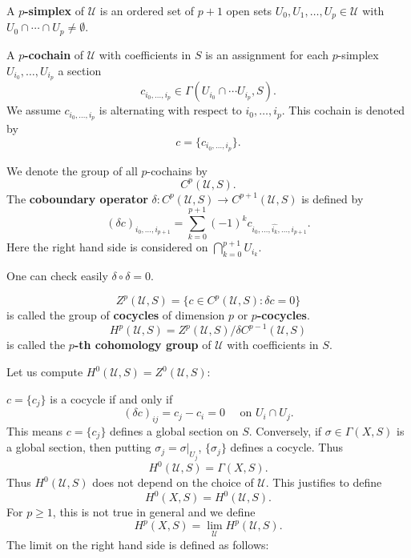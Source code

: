 \documentclass[12pt]{article}
\begin{document}
\begin{definition}
  A \textbf{\(p\)-simplex} of \(\mathcal{U}\) is an ordered set of \(p+1\) open sets
  \(U_0,U_1,\ldots,U_p\in \mathcal{U}\) with \(U_0\cap \cdots \cap U_p\neq\emptyset\).
\end{definition}
\begin{definition}
  A \textbf{\(p\)-cochain} of \(\mathcal{U}\) with coefficients in \(S\) is an
  assignment for each \(p\)-simplex \(U_{i_0},\ldots,U_{i_p}\) a section \[
    c_{i_0,\ldots,i_p}\in \Gamma(U_{i_0}\cap \cdots U_{i_p},S)
  .\] We assume \(c_{i_0,\ldots,i_p}\) is alternating with respect to
  \(i_0,\ldots,i_p\). This cochain is denoted by \[
    c=\{c_{i_0,\ldots,i_p}\}
  .\] 
\end{definition}
\begin{definition}
  We denote the group of all \(p\)-cochains by \[
    C^p(\mathcal{U},S)
  .\] The \textbf{coboundary operator} \(\delta\colon C^p(\mathcal{U},S)\to C^{p+1}
  (\mathcal{U},S)\) is defined by \[
    (\delta c)_{i_0,\ldots,i_{p+1}}=
    \sum_{k=0}^{p+1}(-1)^k c_{i_0,\ldots,\widehat{i_k},\ldots,i_{p+1}}
  .\] Here the right hand side is considered on \(\bigcap_{k=0}^{p+1}U_{i_k}\).
\end{definition}

One can check easily \(\delta\circ \delta=0\).

\begin{definition}
  \[
    Z^p(\mathcal{U},S)=\{c\in C^p(\mathcal{U},S):\delta c=0\}
  \] is called the group of \textbf{cocycles} of dimension \(p\) or
  \textbf{\(p\)-cocycles}. \[
    H^p(\mathcal{U},S)=Z^{p}(\mathcal{U},S)/\delta C^{p-1}(\mathcal{U},S)
  \] is called the \textbf{\(p\)-th cohomology group} of \(\mathcal{U}\) with
  coefficients in \(S\).
\end{definition}

Let us compute \(H^0(\mathcal{U},S)=Z^0(\mathcal{U},S)\):

\(c=\{c_j\}\) is a cocycle if and only if \[
  (\delta c)_{ij}=c_j-c_i=0\quad \text{ on }U_i\cap U_j 
.\] This means \(c=\{c_j\}\) defines a global section on \(S\). Conversely, if
\(\sigma\in \Gamma(X,S)\) is a global section, then putting
\(\sigma_j=\sigma\big|_{U_j}\), \(\{\sigma_j\}\) defines a cocycle. Thus \[
  H^0(\mathcal{U},S)=\Gamma(X,S)
.\] Thus \(H^0(\mathcal{U},S)\) does not depend on the choice of \(\mathcal{U}\).
This justifies to define \[
  \boxed{H^0(X,S)=H^0(\mathcal{U},S)}.
\] For \(p\ge 1\), this is not true in general and we define \[
  H^p(X,S)=\lim_{\mathcal{U}} H^p(\mathcal{U},S)
.\] The limit on the right hand side is defined as follows:
\end{document}
